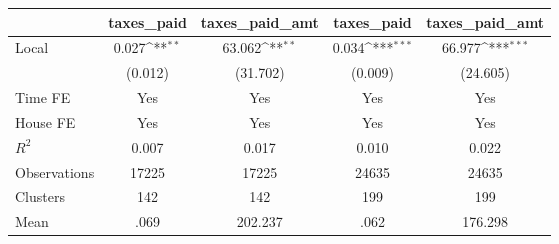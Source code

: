 {
\def\sym#1{\ifmmode^{#1}\else\(^{#1}\)\fi}
\begin{tabular}{l*{4}{c}}
\hline\hline
                &\multicolumn{1}{c}{taxes\_paid}&\multicolumn{1}{c}{taxes\_paid\_amt}&\multicolumn{1}{c}{taxes\_paid}&\multicolumn{1}{c}{taxes\_paid\_amt}\\
\hline
Local           &    0.027\sym{**} &   63.062\sym{**} &    0.034\sym{***}&   66.977\sym{***}\\
                &  (0.012)         & (31.702)         &  (0.009)         & (24.605)         \\
Time FE         &      Yes         &      Yes         &      Yes         &      Yes         \\
House FE        &      Yes         &      Yes         &      Yes         &      Yes         \\
\hline
\(R^{2}\)       &    0.007         &    0.017         &    0.010         &    0.022         \\
Observations    &    17225         &    17225         &    24635         &    24635         \\
Clusters        &      142         &      142         &      199         &      199         \\
Mean            &     .069         &  202.237         &     .062         &  176.298         \\
\hline\hline
\end{tabular}
}
